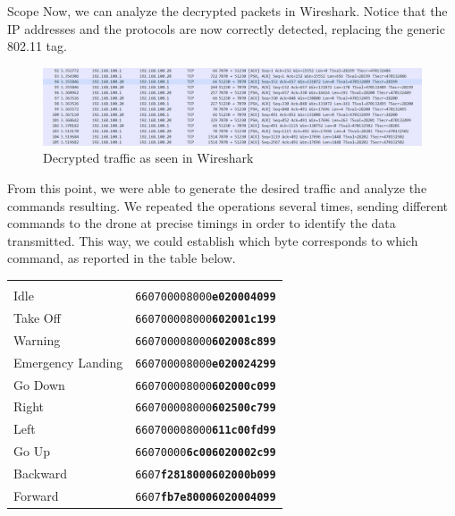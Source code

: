 \begin{chaptercover}{Scope}
Now, we can analyze the decrypted packets in Wireshark. Notice that the IP addresses and the protocols are now correctly detected, replacing the generic 802.11 tag.

\begin{figure}[H]
  \centering
  \includegraphics[width=\linewidth]{figures/traffic-analysis-decrypted-packets}
  \caption{Decrypted traffic as seen in Wireshark}
  \label{fig:traffic-analysis-decrypted-packets}
\end{figure}

From this point, we were able to generate the desired traffic and analyze the commands resulting. We repeated the operations several times, sending different commands to the drone at precise timings in order to identify the data transmitted. This way, we could establish which byte corresponds to which command, as reported in the table below.

\begingroup
\renewcommand*{\arraystretch}{1.3}
\begin{center}
  \begin{tabular}{L{6cm}L{8cm}}
   &  \\
  Idle &              \texttt{660700008000\textbf{e020004099}} \\
  Take Off &          \texttt{660700008000\textbf{602001c199}} \\
  Warning &           \texttt{660700008000\textbf{602008c899}} \\
  Emergency Landing & \texttt{660700008000\textbf{e020024299}} \\
  Go Down &           \texttt{660700008000\textbf{602000c099}} \\
  Right &             \texttt{660700008000\textbf{602500c799}} \\
  Left &              \texttt{660700008000\textbf{611c00fd99}} \\
  Go Up &             \texttt{66070000\textbf{6c006020002c99}} \\
  Backward &          \texttt{6607\textbf{f2818000602000b099}} \\
  Forward &           \texttt{6607\textbf{fb7e80006020004099}} \\
\end{tabular}
\end{center}
\endgroup


\end{chaptercover}
